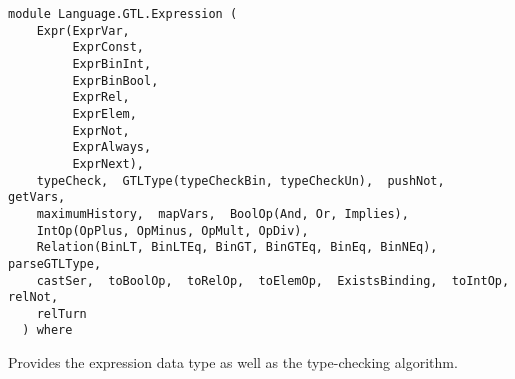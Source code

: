 \label{module:Language.GTL.Expression}
\haddockbeginheader
{\haddockverb\begin{verbatim}
module Language.GTL.Expression (
    Expr(ExprVar,
         ExprConst,
         ExprBinInt,
         ExprBinBool,
         ExprRel,
         ExprElem,
         ExprNot,
         ExprAlways,
         ExprNext), 
    typeCheck,  GTLType(typeCheckBin, typeCheckUn),  pushNot,  getVars, 
    maximumHistory,  mapVars,  BoolOp(And, Or, Implies), 
    IntOp(OpPlus, OpMinus, OpMult, OpDiv), 
    Relation(BinLT, BinLTEq, BinGT, BinGTEq, BinEq, BinNEq),  parseGTLType, 
    castSer,  toBoolOp,  toRelOp,  toElemOp,  ExistsBinding,  toIntOp,  relNot, 
    relTurn
  ) where\end{verbatim}}
\haddockendheader

Provides the expression data type as well as the type-checking algorithm.
\par

